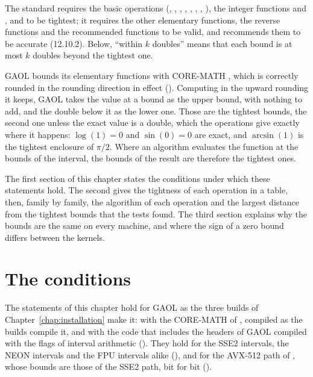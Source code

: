 \documentclass[12pt,a4paper,twoside,openright]{book}
\begin{document}
\noindent
The standard requires the basic operations (, ,
, , , , , ),
the integer functions and ,  and  to be
tightest; it requires the other elementary functions, the reverse functions
and the recommended functions to be valid, and recommends them to be
accurate (12.10.2). Below, ``within $k$ doubles'' means that each bound is
at most $k$ doubles beyond the tightest one.

\medskip
GAOL bounds its elementary functions with CORE-MATH \cite{CoreMath:2022},
which is correctly rounded in the rounding direction in effect
().
Computing in the upward rounding it keeps, GAOL takes the value at a bound
as the upper bound, with nothing to add, and the double below it as the
lower one. Those are the tightest bounds, the second one unless the exact
value is a double, which the operations give exactly where it happens:
$\log(1)=0$ and $\sin(0)=0$ are exact, and $\arcsin(1)$ is the tightest
enclosure of $\pi/2$. Where an algorithm evaluates the function at the
bounds of the interval, the bounds of the result are therefore the tightest
ones.

\medskip
The first section of this chapter states the conditions under which these
statements hold. The second gives the tightness of each operation in a
table, then, family by family, the algorithm of each operation and the
largest distance from the tightest bounds that the tests found. The third
section explains why the bounds are the same on every machine, and where
the sign of a zero bound differs between the kernels.

\section{The conditions}\label{sec:accuracy-conditions}
%

The statements of this chapter hold for GAOL as the three builds of
Chapter~\ref{chap:installation} make it: with the CORE-MATH of
, compiled as the builds compile it, and with the code
that includes the headers of GAOL compiled with the flags of interval
arithmetic (). They hold for the SSE2 intervals, the
NEON intervals\newinvfive{} and the FPU intervals alike
(), and for the AVX-512 path of
, whose bounds are those of the SSE2 path, bit
for bit ().
\end{document}
